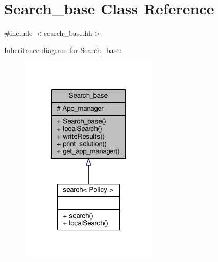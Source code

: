 \hypertarget{classSearch__base}{\section{Search\-\_\-base Class Reference}
\label{classSearch__base}
}


{\ttfamily \#include $<$search\-\_\-base.\-hh$>$}



Inheritance diagram for Search\-\_\-base\-:\nopagebreak
\begin{figure}[H]
\begin{center}
\leavevmode
\includegraphics[width=188pt]{classSearch__base__inherit__graph}
\end{center}
\end{figure}


